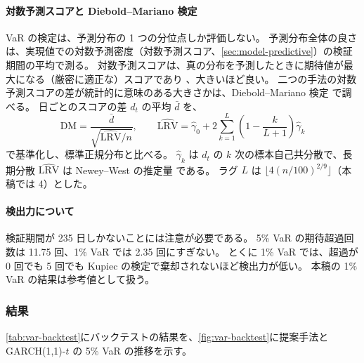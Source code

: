 \paragraph{対数予測スコアと Diebold–Mariano 検定}
VaR の検定は、予測分布の 1 つの分位点しか評価しない。
予測分布全体の良さは、実現値での対数予測密度（対数予測スコア、\cref{sec:model-predictive}）の検証期間の平均で測る。
対数予測スコアは、真の分布を予測したときに期待値が最大になる（厳密に適正な）スコアであり \parencite{gneiting2007}、大きいほど良い。
二つの手法の対数予測スコアの差が統計的に意味のある大きさかは、Diebold–Mariano 検定 \parencite{diebold1995}で調べる。
日ごとのスコアの差 $d_t$ の平均 $\bar d$ を、
\begin{equation}
  \mathrm{DM} = \frac{\bar d}{\sqrt{\widehat{\mathrm{LRV}}/n}}, \qquad
  \widehat{\mathrm{LRV}} = \hat\gamma_0 + 2 \sum_{k=1}^{L} \left(1 - \frac{k}{L+1}\right) \hat\gamma_k
  \label{eq:dm}
\end{equation}
で基準化し、標準正規分布と比べる。
$\hat\gamma_k$ は $d_t$ の $k$ 次の標本自己共分散で、長期分散 $\widehat{\mathrm{LRV}}$ は Newey–West の推定量 \parencite{newey1987}である。
ラグ $L$ は $\lfloor 4 (n/100)^{2/9} \rfloor$（本稿では 4）とした。

\paragraph{検出力について}
検証期間が 235 日しかないことには注意が必要である。
5\% VaR の期待超過回数は 11.75 回、1\% VaR では 2.35 回にすぎない。
とくに 1\% VaR では、超過が 0 回でも 5 回でも Kupiec の検定で棄却されないほど検出力が低い。
本稿の 1\% VaR の結果は参考値として扱う。

\subsubsection{結果}

\cref{tab:var-backtest}にバックテストの結果を、\cref{fig:var-backtest}に提案手法と GARCH(1,1)-$t$ の 5\% VaR の推移を示す。

\begin{table}[tbp]
  \centering
  \caption{VaR のバックテスト（推定窓 250 日、検証 235 日：2025 年 9 月 11 日〜2026 年 8 月 31 日）。
    超過率の括弧内は超過回数（期待値は 5\% VaR で 11.75 回、1\% VaR で 2.35 回）。
    $p_{\mathrm{POF}}$ は Kupiec の検定、$p_{\mathrm{CC}}$ は Christoffersen の条件付き被覆検定の $p$ 値。
    予測スコアは対数予測スコアの平均（大きいほど良い）。
    「対 GARCH-$t$」は GARCH(1,1)-$t$ との予測スコアの差の平均と、その Diebold–Mariano 検定の $p$ 値。
    時間は 1 日あたりの推定時間の中央値（初日を除く）。}
  \label{tab:var-backtest}
  \footnotesize
  \setlength{\tabcolsep}{3pt}
  
\end{table}

